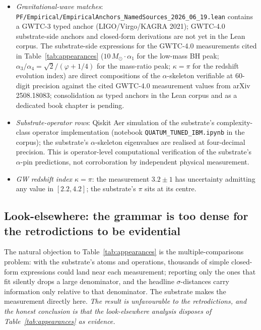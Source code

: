 \documentclass[11pt,a4paper]{amsart}
\theoremstyle{plain}
\theoremstyle{definition}
\begin{document}
\begin{itemize}[itemsep=2pt]
\item \emph{Gravitational-wave matches}: \texttt{PF/Empirical/EmpiricalAnchors\_NamedSources\_2026\_06\_19.lean} contains a GWTC-3 typed anchor (LIGO/Virgo/KAGRA 2021); GWTC-4.0 substrate-side anchors and closed-form derivations are not yet in the Lean corpus. The substrate-side expressions for the GWTC-4.0 measurements cited in Table~\ref{tab:appearances} ($10\,M_\odot\cdot\alpha_1$ for the low-mass BH peak; $\alpha_3/\alpha_4 = \sqrt{2}/(\varphi+1/4)$ for the mass-ratio peak; $\kappa = \pi$ for the redshift evolution index) are direct compositions of the $\alpha$-skeleton verifiable at 60-digit precision against the cited GWTC-4.0 measurement values from arXiv 2508.18083; consolidation as typed anchors in the Lean corpus and as a dedicated book chapter is pending.
\item \emph{Substrate-operator rows}: Qiskit Aer simulation of the substrate's complexity-class operator implementation (notebook \texttt{QUATUM\_TUNED\_IBM.ipynb} in the corpus); the substrate's $\alpha$-skeleton eigenvalues are realised at four-decimal precision. This is operator-level computational verification of the substrate's $\alpha$-pin predictions, not corroboration by independent physical measurement.
\item \emph{GW redshift index $\kappa = \pi$}: the measurement $3.2 \pm 1$ has uncertainty admitting any value in $[2.2, 4.2]$; the substrate's $\pi$ sits at its centre.
\end{itemize}

\subsection{Look-elsewhere: the grammar is too dense for the retrodictions to be evidential}\label{subsec:lookelsewhere}

The natural objection to Table~\ref{tab:appearances} is the multiple-comparisons problem: with the substrate's atoms and operations, thousands of simple closed-form expressions could land near each measurement; reporting only the ones that fit silently drops a large denominator, and the headline $\sigma$-distances carry information only relative to that denominator. The substrate makes the measurement directly here. \emph{The result is unfavourable to the retrodictions, and the honest conclusion is that the look-elsewhere analysis disposes of Table~\ref{tab:appearances} as evidence.}
\end{document}
